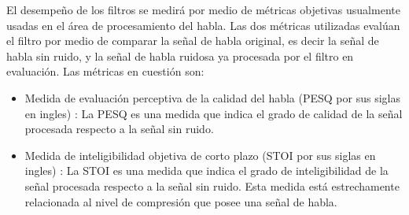 El desempeño de los filtros se medirá por medio de métricas objetivas usualmente usadas en el área de procesamiento del habla. Las dos métricas utilizadas evalúan el filtro por medio de comparar la señal de habla original, es decir la señal de habla sin ruido, y la señal de habla ruidosa ya procesada por el filtro en evaluación. Las métricas en cuestión son:
\begin{itemize}
	\item Medida de evaluación perceptiva de la calidad del habla (PESQ por sus siglas en ingles) \cite{perceptual_evaluation_of_speech_quality_a_new_method_for_speech_quality_assessment_of_telephone_networks_and_codecs}: La PESQ es una medida que indica el grado de calidad de la señal procesada respecto a la señal sin ruido.
	\item Medida de inteligibilidad objetiva de corto plazo (STOI por sus siglas en ingles) \cite{a_short_time_objective_intelligibility_measure_for_time_frequency_weighted_noisy_speech}: La STOI es una medida que indica el grado de inteligibilidad de la señal procesada respecto a la señal sin ruido. Esta medida está estrechamente relacionada al nivel de compresión que posee una señal de habla.
\end{itemize}